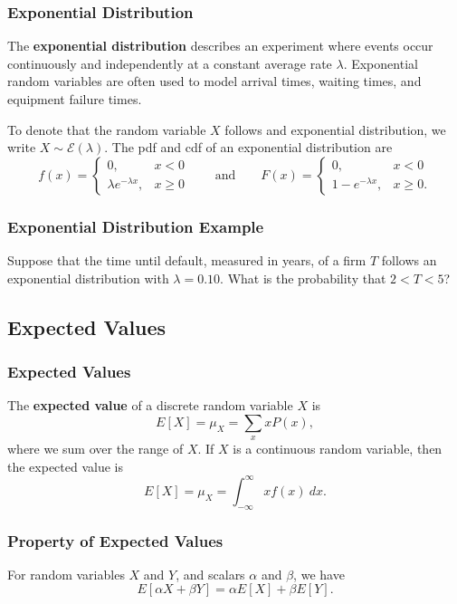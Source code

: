 \documentclass{beamer}
\begin{document}
\begin{frame}
\frametitle{Exponential Distribution}
\small
\begin{Definition}
The {\bf exponential distribution} describes an experiment where events occur continuously and independently at a constant average rate $\lambda$. Exponential random variables are often used to model arrival times, waiting
times, and equipment failure times.
\end{Definition}
To denote that the random variable $X$ follows and exponential distribution, we write $X\sim{\mathcal{E}(\lambda)}$. The pdf and cdf of an exponential distribution are
$$
f(x) = \begin{cases} 0, & x < 0\\ \lambda e^{-\lambda x},& x\geq 0\end{cases} \qquad\text{and}\qquad F(x) = \begin{cases} 0,	&	x < 0\\ 1 - e^{-\lambda x},&	x\geq 0.\end{cases}
$$

\end{frame}

\begin{frame}[t]
\frametitle{Exponential Distribution Example}
\begin{Example}
Suppose that the time until default, measured in years, of a firm $T$ follows an exponential distribution with $\lambda = 0.10$. What is the probability that $2 < T < 5$?
\end{Example}

\end{frame}

\subsection{Expected Values}

\begin{frame}
\frametitle{Expected Values}
\begin{Definition}
The {\bf expected value} of a discrete random variable $X$ is
$$
E[X] = \mu_X = \sum_x xP(x),
$$
where we sum over the range of $X$. If $X$ is a continuous random variable, then the expected value is
$$
E[X] = \mu_X = \int_{-\infty}^\infty x f(x)\ dx.
$$
\end{Definition}
\end{frame}

\begin{frame}
\frametitle{Property of Expected Values}
For random variables $X$ and $Y$, and scalars $\alpha$ and $\beta$, we have
$$
E[\alpha X + \beta Y] = \alpha E[X] + \beta E[Y].
$$
\end{frame}
\end{document}

